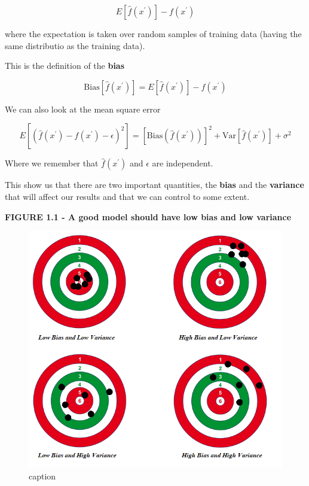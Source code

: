 \documentclass[11pt]{article}
\begin{document}
\begin{equation}
E \left[ \hat f (x^\prime ) \right] - f(x^\prime)
\end{equation}

where the expectation is taken over random samples of training data
(having the same distributio as the training data).

This is the definition of the \textbf{bias}

\begin{equation}
    \textrm{Bias} \left[\hat f (x^\prime) \right] = E \left[ \hat f (x^\prime ) \right] - f(x^\prime)
\end{equation}

We can also look at the mean square error

\begin{equation}
E \left[\left( \hat f (x^\prime ) - f(x^\prime) - \epsilon \right)^2\right] =
\left[ \textrm{Bias} \left( \hat f(x^\prime) \right) \right]^2 + \textrm{Var}\left[ \hat f(x^\prime) \right] + \sigma^2
\end{equation}

Where we remember that \(\hat f (x^\prime)\) and \(\epsilon\) are
independent.

This show us that there are two important quantities, the \textbf{bias}
and the \textbf{variance} that will affect our results and that we can
control to some extent.

    \textbf{FIGURE 1.1 - A good model should have low bias and low variance}

    \begin{figure}
\centering
\includegraphics{./pic/chapter-2-2-pic_0.png}
\caption{caption}
\end{figure}
\end{document}
